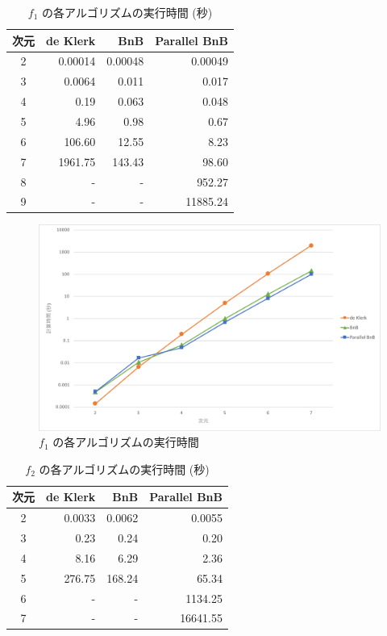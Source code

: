 \documentclass[a4paper,11pt]{jreport}
\begin{document}
\newpage

\begin{table}[h]
\caption{$ f_1 $ の各アルゴリズムの実行時間 (秒)}
\label{tbl:f_1_table}
\begin{center}
\begin{tabular}{|c|r|r|r|} \hline
次元 & de Klerk & BnB & Parallel BnB \\ \hline
2 & 0.00014 & 0.00048 & 0.00049 \\
3 & 0.0064 & 0.011 & 0.017 \\
4 & 0.19 & 0.063 & 0.048 \\
5 & 4.96 & 0.98 & 0.67 \\ 
6 & 106.60 & 12.55 & 8.23 \\
7 & 1961.75 & 143.43 & 98.60 \\
8 & - & - & 952.27 \\
9 & - & - & 11885.24 \\ \hline
\end{tabular}
\end{center}
\end{table}

\begin{figure}[h]
\begin{center}
\includegraphics[width=14cm]{graphs/f_1_time.pdf}
\caption{$ f_1 $ の各アルゴリズムの実行時間}
\label{fig:f_1_time}
\end{center}
\end{figure}

\newpage

\begin{table}[h]
\caption{$ f_2 $ の各アルゴリズムの実行時間 (秒)}
\label{tbl:f_2_table}
\begin{center}
\begin{tabular}{|c|r|r|r|} \hline
次元 & de Klerk & BnB & Parallel BnB \\ \hline
2 & 0.0033 & 0.0062 & 0.0055 \\
3 & 0.23 & 0.24 & 0.20 \\
4 & 8.16 & 6.29 & 2.36 \\
5 & 276.75 & 168.24 & 65.34 \\ 
6 & - & - & 1134.25 \\
7 & - & - & 16641.55 \\ \hline
\end{tabular}
\end{center}
\end{table}
\end{document}
